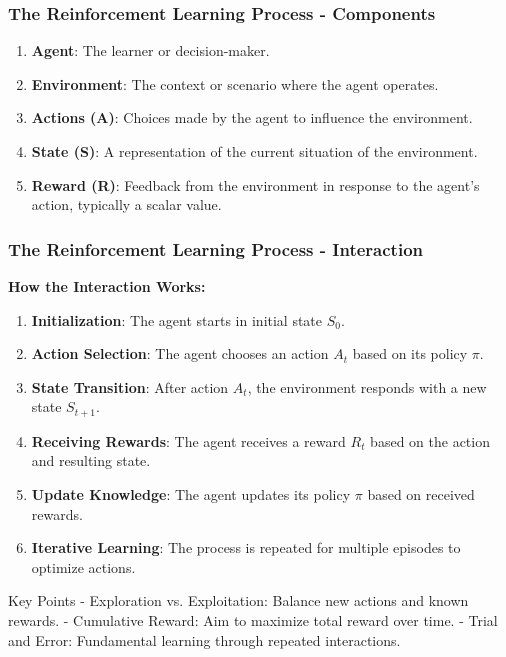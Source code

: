 \documentclass[aspectratio=169]{beamer}
\begin{document}
\begin{frame}[fragile]
    \frametitle{The Reinforcement Learning Process - Components}
    \begin{enumerate}
        \item \textbf{Agent}: The learner or decision-maker.
        \item \textbf{Environment}: The context or scenario where the agent operates.
        \item \textbf{Actions (A)}: Choices made by the agent to influence the environment.
        \item \textbf{State (S)}: A representation of the current situation of the environment.
        \item \textbf{Reward (R)}: Feedback from the environment in response to the agent's action, typically a scalar value.
    \end{enumerate}
\end{frame}

\begin{frame}[fragile]
    \frametitle{The Reinforcement Learning Process - Interaction}
    \textbf{How the Interaction Works:}
    \begin{enumerate}
        \item \textbf{Initialization}: The agent starts in initial state \( S_0 \).
        \item \textbf{Action Selection}: The agent chooses an action \( A_t \) based on its policy \( \pi \).
        \item \textbf{State Transition}: After action \( A_t \), the environment responds with a new state \( S_{t+1} \).
        \item \textbf{Receiving Rewards}: The agent receives a reward \( R_t \) based on the action and resulting state.
        \item \textbf{Update Knowledge}: The agent updates its policy \( \pi \) based on received rewards.
        \item \textbf{Iterative Learning}: The process is repeated for multiple episodes to optimize actions.
    \end{enumerate}
    
    \begin{block}{Key Points}
        - Exploration vs. Exploitation: Balance new actions and known rewards.
        - Cumulative Reward: Aim to maximize total reward over time.
        - Trial and Error: Fundamental learning through repeated interactions.
    \end{block}
\end{frame}
\end{document}
